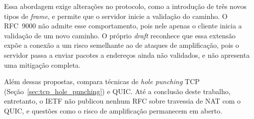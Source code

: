 Essa abordagem exige alterações no protocolo, como a introdução de três novos tipos de \textit{frame}, e permite que o servidor inicie a validação do caminho. O RFC~9000 não admite esse comportamento, pois nele apenas o cliente inicia a validação de um novo caminho. O próprio \textit{draft} reconhece que essa extensão expõe a conexão a um risco semelhante ao de ataques de amplificação, pois o servidor passa a enviar pacotes a endereços ainda não validados, e não apresenta uma mitigação completa.

Além dessas propostas, \citet{liang2024nat} compara técnicas de \textit{hole punching} TCP (Seção~\ref{sec:tcp_hole_punching}) e QUIC. Até a conclusão deste trabalho, entretanto, o IETF não publicou nenhum RFC sobre travessia de NAT com o QUIC, e questões como o risco de amplificação permanecem em aberto.

